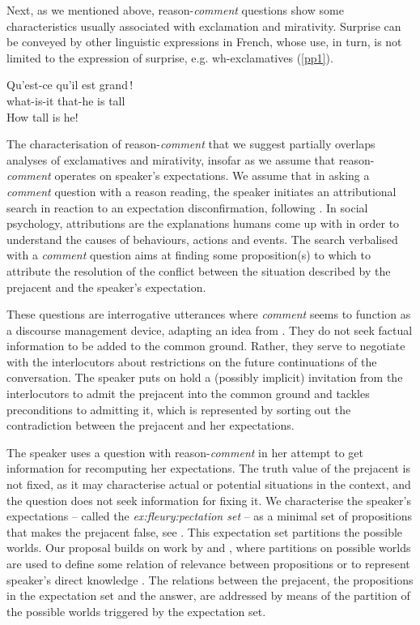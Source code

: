 \documentclass[output=paper,colorlinks,citecolor=brown,
]{langscibook}
\begin{document}
Next, as we mentioned above,  reason-\textit{comment} questions show some characteristics usually associated with exclamation and mirativity.
Surprise can be conveyed by other linguistic expressions in French, whose use, in turn, 
is not limited to the expression of surprise, e.g. wh-exclamatives (\ref{pp1}).
\begin{exe}
\ex \label{pp1} \gll Qu'est-ce qu'il est grand\,! \\
what-is-it that-he is tall\\
\glt How tall is he!
\end{exe}

The characterisation of reason-\textit{comment} that we suggest partially overlaps analyses of exclamatives and mirativity, insofar as we
assume that reason-\textit{comment} operates on speaker's expectations.
%
We assume that in asking a \textit{comment} question with a reason reading, the speaker initiates  an {attributional search}  in reaction to an expectation disconfirmation, following \cite{FleuryTovena18}. 
 In social psychology, {attributions} \citep{Heider58} are the explanations humans come up with in order to understand the causes of behaviours, actions and events.    The search verbalised with a \textit{comment} question aims at finding some proposition(s) to which to attribute the resolution of the conflict  between the situation described by the prejacent and the speaker's expectation.
  
These questions are interrogative utterances where \textit{comment}  seems to function as a discourse management device, adapting an idea from  \citep{Krifka08}.   They do not seek factual information to be added to the common ground. Rather, they serve to 
negotiate with the interlocutors about  restrictions on the future continuations of the conversation.  The speaker puts on
hold a (possibly implicit) invitation from the interlocutors to admit the prejacent into the common ground and tackles  preconditions to admitting it, which is represented by sorting out the contradiction between the prejacent and her expectations.

The speaker uses a question with reason-\textit{comment}  in her attempt to get information for recomputing her expectations. The  truth value of the prejacent is not fixed, as it may characterise  actual or potential situations in the context, and the question does not seek information for fixing it.  
We characterise the speaker's expectations -- called the \textit{ex:fleury:pectation set} -- as a minimal set of propositions that makes the prejacent false, see  .
This expectation set partitions the possible worlds.
Our proposal builds on work by  \citep{Lewis88} and \citep{fintelGillies10}, 
where partitions on
possible worlds are used to define some relation of relevance between propositions \citep{Lewis88} or to represent speaker's direct knowledge \citep{fintelGillies10}.
The relations between 
the prejacent, the propositions in the expectation set and the answer, are addressed by means of 
the partition of the possible worlds triggered by the expectation set.
\end{document}

